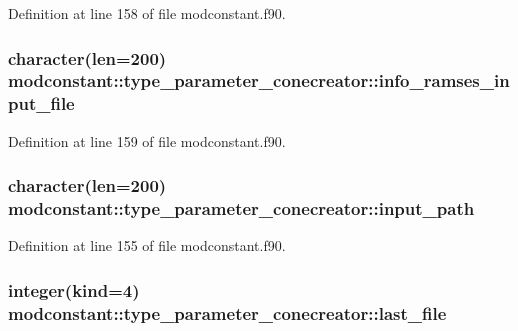 Definition at line 158 of file modconstant.\-f90.

\hypertarget{structmodconstant_1_1type__parameter__conecreator_aa2e7ccb48f0190fad5e9900b5b1b4d63}{
\subsubsection[{info\-\_\-ramses\-\_\-input\-\_\-file}]{\setlength{\rightskip}{0pt plus 5cm}character(len=200) modconstant\-::type\-\_\-parameter\-\_\-conecreator\-::info\-\_\-ramses\-\_\-input\-\_\-file}}\label{structmodconstant_1_1type__parameter__conecreator_aa2e7ccb48f0190fad5e9900b5b1b4d63}


Definition at line 159 of file modconstant.\-f90.

\hypertarget{structmodconstant_1_1type__parameter__conecreator_ac382f8cfe1347c4242bded522f3206df}{
\subsubsection[{input\-\_\-path}]{\setlength{\rightskip}{0pt plus 5cm}character(len=200) modconstant\-::type\-\_\-parameter\-\_\-conecreator\-::input\-\_\-path}}\label{structmodconstant_1_1type__parameter__conecreator_ac382f8cfe1347c4242bded522f3206df}


Definition at line 155 of file modconstant.\-f90.

\hypertarget{structmodconstant_1_1type__parameter__conecreator_a23caca71a8dc1b330de47e8a6873012e}{
\subsubsection[{last\-\_\-file}]{\setlength{\rightskip}{0pt plus 5cm}integer(kind=4) modconstant\-::type\-\_\-parameter\-\_\-conecreator\-::last\-\_\-file}}\label{structmodconstant_1_1type__parameter__conecreator_a23caca71a8dc1b330de47e8a6873012e}



